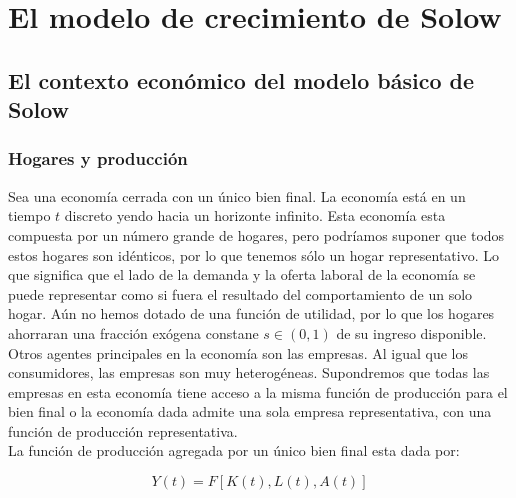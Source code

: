 \setcounter{chapter}{1}
\chapter{El modelo de crecimiento de Solow}

\section{El contexto económico del modelo básico de Solow}

\subsection{Hogares y producción}

Sea una economía cerrada con un único bien final. La economía está en un tiempo $t$ discreto yendo hacia un horizonte infinito. Esta economía esta compuesta por un número grande de hogares, pero podríamos suponer que todos estos hogares son idénticos, por lo que tenemos sólo un hogar representativo. Lo que significa que el lado de la demanda y la oferta laboral de la economía se puede representar como si fuera el resultado del comportamiento de un solo hogar. Aún no  hemos dotado de una función de utilidad, por lo que los hogares ahorraran una fracción exógena constane $s\in (0,1)$ de su ingreso disponible.\\

Otros agentes principales en la economía son las empresas. Al igual que los consumidores, las empresas son muy heterogéneas. Supondremos que todas las empresas en esta economía tiene acceso a la misma función de producción para el bien final o la economía dada admite una sola empresa representativa, con una función de producción representativa.\\

La función de producción agregada por un único bien final esta dada por:

\begin{equation}
    Y(t)=F\left[K(t),L(t),A(t)\right]
\end{equation}

